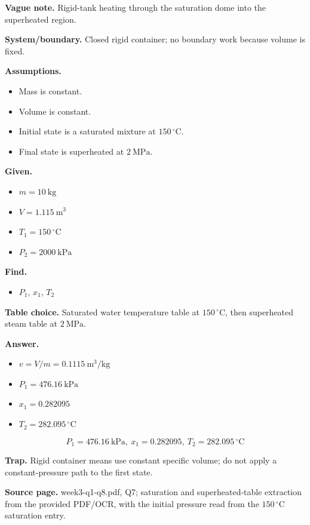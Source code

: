 \textbf{Vague note.} Rigid-tank heating through the saturation dome into the superheated region.

\textbf{System/boundary.} Closed rigid container; no boundary work because volume is fixed.

\textbf{Assumptions.}
\begin{itemize}
  \item Mass is constant.
  \item Volume is constant.
  \item Initial state is a saturated mixture at $150\,^{\circ}\mathrm{C}$.
  \item Final state is superheated at $2\ \mathrm{MPa}$.
\end{itemize}

\textbf{Given.}
\begin{itemize}
  \item $m = 10\ \mathrm{kg}$
  \item $V = 1.115\ \mathrm{m^3}$
  \item $T_1 = 150\,^{\circ}\mathrm{C}$
  \item $P_2 = 2000\ \mathrm{kPa}$
\end{itemize}

\textbf{Find.}
\begin{itemize}
  \item $P_1$, $x_1$, $T_2$
\end{itemize}

\textbf{Table choice.} Saturated water temperature table at $150\,^{\circ}\mathrm{C}$, then superheated steam table at $2\ \mathrm{MPa}$.

\textbf{Answer.}
\begin{itemize}
  \item $v = V/m = 0.1115\ \mathrm{m^3/kg}$
  \item $P_1 = 476.16\ \mathrm{kPa}$
  \item $x_1 = 0.282095$
  \item $T_2 = 282.095\,^{\circ}\mathrm{C}$
\end{itemize}

\[\boxed{P_1 = 476.16\ \mathrm{kPa},\ x_1 = 0.282095,\ T_2 = 282.095\,^{\circ}\mathrm{C}}\]

\textbf{Trap.} Rigid container means use constant specific volume; do not apply a constant-pressure path to the first state.

\textbf{Source page.} week3-q1-q8.pdf, Q7; saturation and superheated-table extraction from the provided PDF/OCR, with the initial pressure read from the $150\,^{\circ}\mathrm{C}$ saturation entry.

